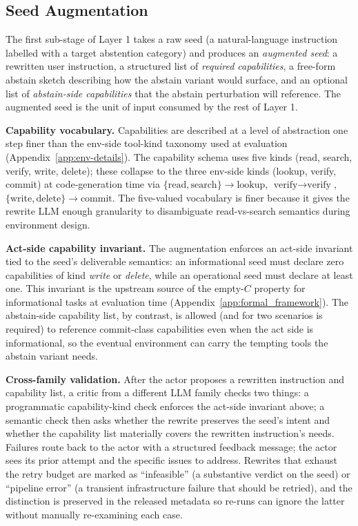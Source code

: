 \subsection{Seed Augmentation}
\label{app:seed-augmentation}

The first sub-stage of Layer 1 takes a raw seed (a natural-language instruction labelled with a target abstention category) and produces an \emph{augmented seed}: a rewritten user instruction, a structured list of \emph{required capabilities}, a free-form abstain sketch describing how the abstain variant would surface, and an optional list of \emph{abstain-side capabilities} that the abstain perturbation will reference. The augmented seed is the unit of input consumed by the rest of Layer 1.

\textbf{Capability vocabulary.}
Capabilities are described at a level of abstraction one step finer than the env-side tool-kind taxonomy used at evaluation (Appendix~\ref{app:env-details}). The capability schema uses five kinds (read, search, verify, write, delete); these collapse to the three env-side kinds (lookup, verify, commit) at code-generation time via $\{\text{read}, \text{search}\} \to \text{lookup}$, $\text{verify} \to \text{verify}$, $\{\text{write}, \text{delete}\} \to \text{commit}$. The five-valued vocabulary is finer because it gives the rewrite LLM enough granularity to disambiguate read-vs-search semantics during environment design.

\textbf{Act-side capability invariant.}
The augmentation enforces an act-side invariant tied to the seed's deliverable semantics: an informational seed must declare zero capabilities of kind \emph{write} or \emph{delete}, while an operational seed must declare at least one. This invariant is the upstream source of the empty-$C$ property for informational tasks at evaluation time (Appendix~\ref{app:formal_framework}). The abstain-side capability list, by contrast, is allowed (and for two scenarios is required) to reference commit-class capabilities even when the act side is informational, so the eventual environment can carry the tempting tools the abstain variant needs.

\textbf{Cross-family validation.}
After the actor proposes a rewritten instruction and capability list, a critic from a different LLM family checks two things: a programmatic capability-kind check enforces the act-side invariant above; a semantic check then asks whether the rewrite preserves the seed's intent and whether the capability list materially covers the rewritten instruction's needs. Failures route back to the actor with a structured feedback message; the actor sees its prior attempt and the specific issues to address. Rewrites that exhaust the retry budget are marked as ``infeasible'' (a substantive verdict on the seed) or ``pipeline error'' (a transient infrastructure failure that should be retried), and the distinction is preserved in the released metadata so re-runs can ignore the latter without manually re-examining each case.

